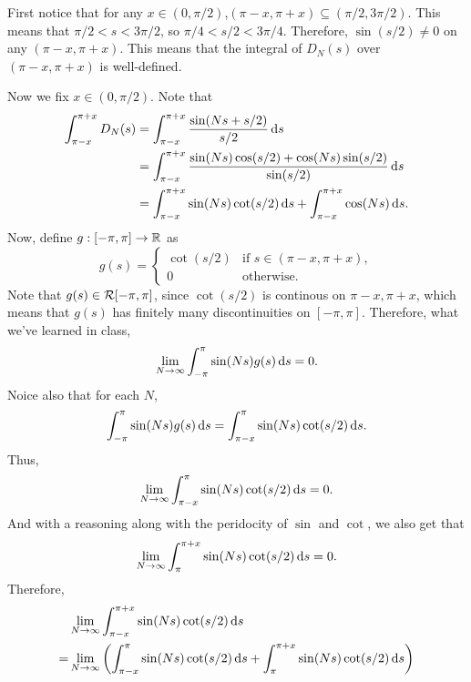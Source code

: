 \documentclass[12pt]{article}
\begin{document}
\begin{fproof}[4(a)]
 First notice that for any \(x \in (0, \pi/2)\),\((\pi - x, \pi + x) \subseteq (\pi/2, 3\pi/2)\).
 This means that \(\pi/2 < s < 3\pi/2 \), so \(\pi/4 < s/2 < 3\pi/4\).
 Therefore, \(\sin(s/2) \neq 0\) on any \((\pi - x, \pi + x)\).
 This means that the integral of \(D_N(s)\) over \((\pi - x, \pi + x)\) is well-defined.

 Now we fix \(x \in (0, \pi/2)\).
 Note that
 \begin{align*}
   \int_{\pi - x}^{\pi+x} D_N(s) 
   &= \int_{\pi - x}^{\pi+x} \frac{\sin(Ns + s/2)}{s/2} \mathop{}\!\mathrm{d} s\\
   &=\int_{\pi - x}^{\pi+x}\frac{\sin(Ns)\cos(s/2)+\cos(Ns)\sin(s/2)}{\sin(s/2)} \mathop{}\!\mathrm{d} s\\
   &=\int_{\pi - x}^{\pi+x} \sin(Ns) \cot(s/2) \mathop{}\!\mathrm{d} s + \int_{\pi - x}^{\pi+x} \cos(Ns) \mathop{}\!\mathrm{d} s.
 \end{align*}
 Now, define \(g: [-\pi, \pi] \to \mathbb {R}\) as
 \[
 g(s) = \begin{cases}
   \cot(s/2) & \text{if } s \in (\pi-x, \pi+x),\\
   0 & \text{otherwise}.
 \end{cases}
 \]
 Note that \(g(s)\in \mathcal{R}[-\pi, \pi]\), since \(\cot(s/2)\) is continous on \(\pi-x, \pi+x\), which means that \(g(s)\) has finitely many discontinuities on \([-\pi, \pi]\).
 Therefore, what we've learned in class,
 \begin{align*}
   \lim_{N\to \infty} \int_{-\pi}^{\pi} \sin(Ns) g(s) \mathop{}\!\mathrm{d} s = 0.
 \end{align*}
 Noice also that for each \(N\),
 \begin{align*}
   \int_{-\pi}^{\pi} \sin(Ns) g(s) \mathop{}\!\mathrm{d} s = \int_{\pi-x}^{\pi} \sin(Ns) \cot(s/2) \mathop{}\!\mathrm{d} s.
 \end{align*}
 Thus, 
 \begin{align*}
   \lim_{N\to \infty} \int_{\pi-x}^{\pi} \sin(Ns) \cot(s/2) \mathop{}\!\mathrm{d} s = 0.
 \end{align*}
 And with a reasoning along with the peridocity of \(\sin\) and \(\cot\), we also get that
 \begin{align*}
   \lim_{N\to \infty} \int_{\pi}^{\pi+x} \sin(Ns) \cot(s/2) \mathop{}\!\mathrm{d} s = 0.
 \end{align*}
 Therefore, 
 \begin{align*}
   &\lim_{N \to \infty} \int_{\pi-x}^{\pi+x} \sin(Ns) \cot(s/2) \ds \\
   =& \lim_{N \to \infty} \pare{\int_{\pi-x}^{\pi} \sin(Ns) \cot(s/2) \ds + \int_{\pi}^{\pi+x} \sin(Ns) \cot(s/2) \ds}\\

\end{align*}
\end{fproof}
\end{document}
